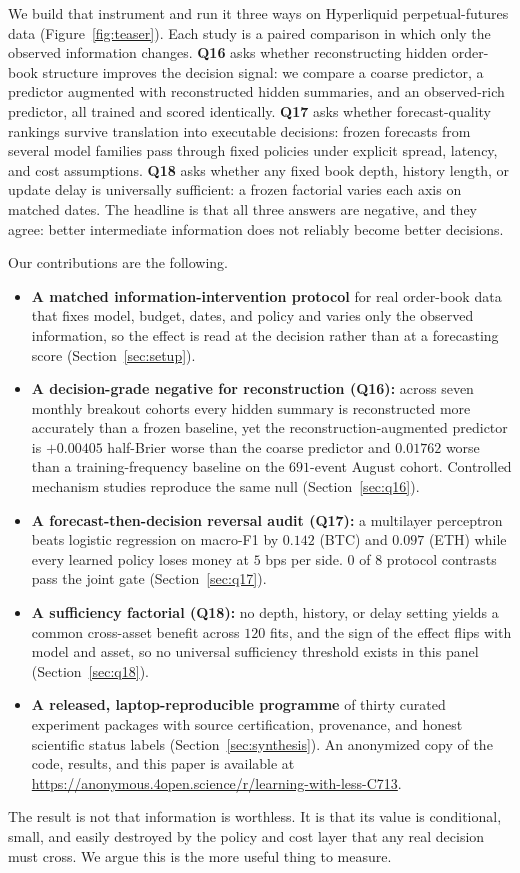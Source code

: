 We build that instrument and run it three ways on Hyperliquid perpetual-futures data
(Figure~\ref{fig:teaser}). Each study is a paired comparison in which only the observed
information changes. \textbf{Q16} asks whether reconstructing hidden order-book structure
improves the decision signal: we compare a coarse predictor, a predictor augmented with
reconstructed hidden summaries, and an observed-rich predictor, all trained and scored
identically. \textbf{Q17} asks whether forecast-quality rankings survive translation into
executable decisions: frozen forecasts from several model families pass through fixed
policies under explicit spread, latency, and cost assumptions. \textbf{Q18} asks whether
any fixed book depth, history length, or update delay is universally sufficient: a frozen
factorial varies each axis on matched dates. The headline is that all three answers are
negative, and they agree: better intermediate information does not reliably become better
decisions.

Our contributions are the following.
\begin{itemize}[leftmargin=1.4em]
\item \textbf{A matched information-intervention protocol} for real order-book data that
 fixes model, budget, dates, and policy and varies only the observed information, so the
 effect is read at the decision rather than at a forecasting score
 (Section~\ref{sec:setup}).
\item \textbf{A decision-grade negative for reconstruction (Q16):} across seven monthly
 breakout cohorts every hidden summary is reconstructed more accurately than a frozen
 baseline, yet the reconstruction-augmented predictor is $+0.00405$ half-Brier worse than
 the coarse predictor and $0.01762$ worse than a training-frequency baseline on the
 $691$-event August cohort. Controlled mechanism studies reproduce the same null
 (Section~\ref{sec:q16}).
\item \textbf{A forecast-then-decision reversal audit (Q17):} a multilayer perceptron
 beats logistic regression on macro-F1 by $0.142$ (BTC) and $0.097$ (ETH) while every
 learned policy loses money at $5$ bps per side. $0$ of $8$ protocol contrasts pass the
 joint gate (Section~\ref{sec:q17}).
\item \textbf{A sufficiency factorial (Q18):} no depth, history, or delay setting yields a
 common cross-asset benefit across $120$ fits, and the sign of the effect flips with
 model and asset, so no universal sufficiency threshold exists in this panel
 (Section~\ref{sec:q18}).
\item \textbf{A released, laptop-reproducible programme} of thirty curated experiment
 packages with source certification, provenance, and honest scientific status labels
 (Section~\ref{sec:synthesis}). An anonymized copy of the code, results, and this paper is
 available at \url{https://anonymous.4open.science/r/learning-with-less-C713}.
\end{itemize}

The result is not that information is worthless. It is that its value is conditional,
small, and easily destroyed by the policy and cost layer that any real decision must
cross. We argue this is the more useful thing to measure.
